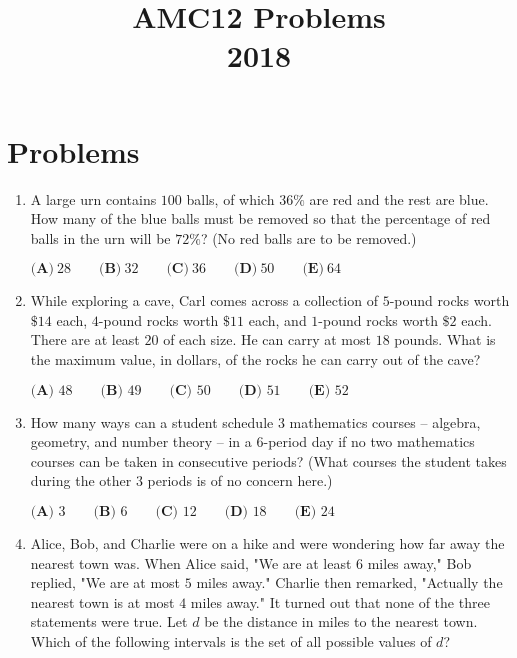\documentclass{article}
\title{AMC12 Problems \\ 2018}
\date{}
\begin{document}
\maketitle\thispagestyle{fancy}\newpage\section*{Problems}\begin{enumerate}[label=\arabic*., itemsep=0.5em]\item A large urn contains \(100\) balls, of which \(36 \%\) are red and the rest are blue. How many of the blue balls must be removed so that the percentage of red balls in the urn will be \(72 \%\)? (No red balls are to be removed.)

\( \textbf{(A)}\ 28 \qquad\textbf{(B)}\  32 \qquad\textbf{(C)}\  36 \qquad\textbf{(D)}\ 
 50 \qquad\textbf{(E)}\ 64 \)\par \vspace{0.5em}\item While exploring a cave, Carl comes across a collection of \(5\)-pound rocks worth \(\$14\) each, \(4\)-pound rocks worth \(\$11\) each, and \(1\)-pound rocks worth \(\$2\) each. There are at least \(20\) of each size. He can carry at most \(18\) pounds. What is the maximum value, in dollars, of the rocks he can carry out of the cave?

\(\textbf{(A) } 48 \qquad \textbf{(B) } 49 \qquad \textbf{(C) } 50 \qquad \textbf{(D) } 51 \qquad \textbf{(E) } 52 \)\par \vspace{0.5em}\item How many ways can a student schedule \(3\) mathematics courses -- algebra, geometry, and number theory -- in a \(6\)-period day if no two mathematics courses can be taken in consecutive periods? (What courses the student takes during the other \(3\) periods is of no concern here.)

\(\textbf{(A) }3\qquad\textbf{(B) }6\qquad\textbf{(C) }12\qquad\textbf{(D) }18\qquad\textbf{(E) }24\)\par \vspace{0.5em}\item Alice, Bob, and Charlie were on a hike and were wondering how far away the nearest town was. When Alice said, "We are at least \(6\) miles away," Bob replied, "We are at most \(5\) miles away." Charlie then remarked, "Actually the nearest town is at most \(4\) miles away." It turned out that none of the three statements were true. Let \(d\) be the distance in miles to the nearest town. Which of the following intervals is the set of all possible values of \(d\)?


\end{enumerate}
\end{document}
